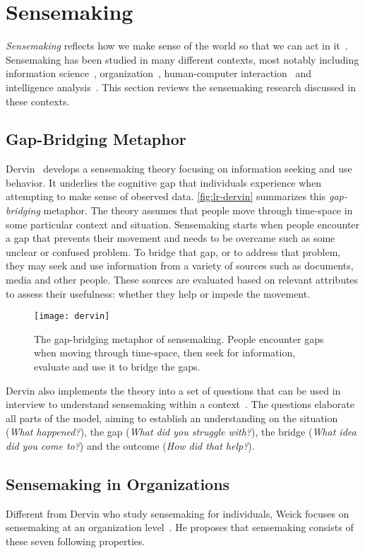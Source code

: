 \section{Sensemaking}
\label{sub:lr-sensemaking}
\emph{Sensemaking} reflects how we make sense of the world so that we can act in it~\cite{Snowden2005}. Sensemaking has been studied in many different contexts, most notably including information science~\cite{Dervin1983}, organization~\cite{Weick1995}, human-computer interaction~\cite{Russell1993} and intelligence analysis~\cite{Pirolli2005,Klein2003}. This section reviews the sensemaking research discussed in these contexts.

\subsection{Gap-Bridging Metaphor}
Dervin~\cite{Dervin1983} develops a sensemaking theory focusing on information seeking and use behavior. It underlies the cognitive gap that individuals experience when attempting to make sense of observed data. \autoref{fig:lr-dervin} summarizes this \emph{gap-bridging} metaphor. The theory assumes that people move through time-space in some particular context and situation. Sensemaking starts when people encounter a gap that prevents their movement and needs to be overcame such as some unclear or confused problem. To bridge that gap, or to address that problem, they may seek and use information from a variety of sources such as documents, media and other people. These sources are evaluated based on relevant attributes to assess their usefulness: whether they help or impede the movement.

\begin{figure}[!htb]
	\centering
	\texttt{[image: dervin]}
	\caption{The gap-bridging metaphor of sensemaking. People encounter gaps when moving through time-space, then seek for information, evaluate and use it to bridge the gaps. }
	\label{fig:lr-dervin}
\end{figure}

Dervin also implements the theory into a set of questions that can be used in interview to understand sensemaking within a context~\cite{Dervin1983}. The questions elaborate all parts of the model, aiming to establish an understanding on the situation (\emph{What happened?}), the gap (\emph{What did you struggle with?}), the bridge (\emph{What idea did you come to?}) and the outcome (\emph{How did that help?}).

\subsection{Sensemaking in Organizations}
Different from Dervin who study sensemaking for individuals, Weick focuses on sensemaking at an organization level~\cite{Weick1995}. He proposes that sensemaking consists of these seven following properties.

